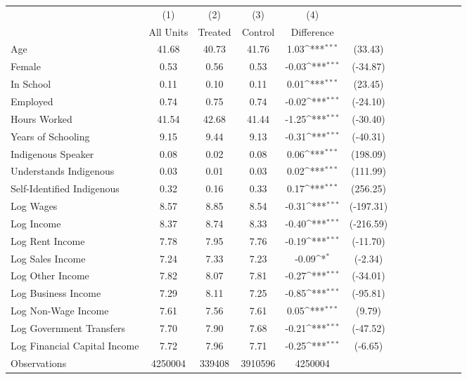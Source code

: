 {
\def\sym#1{\ifmmode^{#1}\else\(^{#1}\)\fi}
\begin{tabular}{l*{4}{ccc}}
\hline\hline
                    &\multicolumn{1}{c}{(1)}&\multicolumn{1}{c}{(2)}&\multicolumn{1}{c}{(3)}&\multicolumn{1}{c}{(4)}         &            \\
                    &   All Units&     Treated&     Control&  Difference         &            \\
\hline
Age                 &       41.68&       40.73&       41.76&        1.03\sym{***}&     (33.43)\\
Female              &        0.53&        0.56&        0.53&       -0.03\sym{***}&    (-34.87)\\
In School           &        0.11&        0.10&        0.11&        0.01\sym{***}&     (23.45)\\
Employed            &        0.74&        0.75&        0.74&       -0.02\sym{***}&    (-24.10)\\
Hours Worked        &       41.54&       42.68&       41.44&       -1.25\sym{***}&    (-30.40)\\
Years of Schooling  &        9.15&        9.44&        9.13&       -0.31\sym{***}&    (-40.31)\\
Indigenous Speaker  &        0.08&        0.02&        0.08&        0.06\sym{***}&    (198.09)\\
Understands Indigenous&        0.03&        0.01&        0.03&        0.02\sym{***}&    (111.99)\\
Self-Identified Indigenous&        0.32&        0.16&        0.33&        0.17\sym{***}&    (256.25)\\
Log Wages           &        8.57&        8.85&        8.54&       -0.31\sym{***}&   (-197.31)\\
Log Income          &        8.37&        8.74&        8.33&       -0.40\sym{***}&   (-216.59)\\
Log Rent Income     &        7.78&        7.95&        7.76&       -0.19\sym{***}&    (-11.70)\\
Log Sales Income    &        7.24&        7.33&        7.23&       -0.09\sym{*}  &     (-2.34)\\
Log Other Income    &        7.82&        8.07&        7.81&       -0.27\sym{***}&    (-34.01)\\
Log Business Income &        7.29&        8.11&        7.25&       -0.85\sym{***}&    (-95.81)\\
Log Non-Wage Income &        7.61&        7.56&        7.61&        0.05\sym{***}&      (9.79)\\
Log Government Transfers&        7.70&        7.90&        7.68&       -0.21\sym{***}&    (-47.52)\\
Log Financial Capital Income&        7.72&        7.96&        7.71&       -0.25\sym{***}&     (-6.65)\\
\hline
Observations        &     4250004&      339408&     3910596&     4250004         &            \\
\hline\hline
\end{tabular}
}
